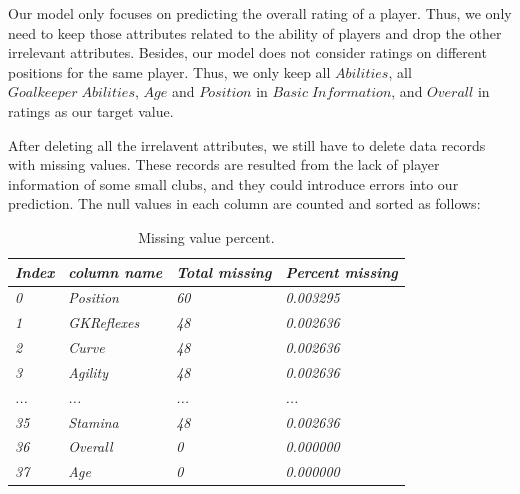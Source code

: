 \documentclass{article}
\begin{document}
\par Our model only focuses on predicting the overall rating of a player. Thus, we only need to keep those attributes related to the ability of players and drop the other irrelevant attributes. Besides, our model does not consider ratings on different positions for the same player. Thus, we only keep all $Abilities$, all $Goalkeeper\; Abilities$, $Age$ and $Position$ in $Basic\; Information$, and $Overall$ in ratings as our target value.

\par After deleting all the irrelavent attributes, we still have to delete data records with missing values. These records are resulted from the lack of player information of some small clubs, and they could introduce errors into our prediction. The null values in each column are counted and sorted as follows:

\begin{table}[]
\centering
\begin{tabular}{|l|l|l|l|}
\hline
\textit{Index} & \textit{column name}          & \textit{Total missing} & \textit{Percent missing} \\ \hline
\textit{0}     & \textit{Position}             & \textit{60}            & \textit{0.003295}        \\ \hline
\textit{1}     & \textit{GKReflexes}           & \textit{48}            & \textit{0.002636}        \\ \hline
\textit{2}     & \textit{Curve}                & \textit{48}            & \textit{0.002636}        \\ \hline
\textit{3}     & \textit{Agility}              & \textit{48}            & \textit{0.002636}        \\ \hline
\textit{...}   & \textit{...}                  & \textit{...}           & \textit{...}             \\ \hline
\textit{35}    & \textit{Stamina}              & \textit{48}            & \textit{0.002636}        \\ \hline
\textit{36}    & \textit{Overall}              & \textit{0}             & \textit{0.000000}        \\ \hline
\textit{37}    & \textit{Age}                  & \textit{0}             & \textit{0.000000}        \\ \hline
\end{tabular}
\caption{Missing value percent.}
\end{table}
\end{document}
